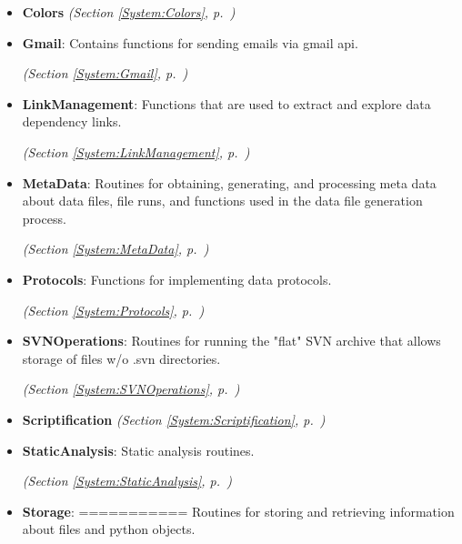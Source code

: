 \begin{itemize}
\setlength{\parskip}{0ex}
\item \textbf{Colors}
  \textit{(Section \ref{System:Colors}, p.~\pageref{System:Colors})}

\item \textbf{Gmail}: Contains functions for sending emails via gmail api.



  \textit{(Section \ref{System:Gmail}, p.~\pageref{System:Gmail})}

\item \textbf{LinkManagement}: 
Functions that are used to extract and explore data dependency links.



  \textit{(Section \ref{System:LinkManagement}, p.~\pageref{System:LinkManagement})}

\item \textbf{MetaData}: 
Routines for obtaining, generating, and processing meta data about data files, 
file runs, and functions used in the data file generation process. 


  \textit{(Section \ref{System:MetaData}, p.~\pageref{System:MetaData})}

\item \textbf{Protocols}: Functions for implementing data protocols.



  \textit{(Section \ref{System:Protocols}, p.~\pageref{System:Protocols})}

\item \textbf{SVNOperations}: Routines for running the "flat" SVN archive that allows storage of files 
w/o .svn directories.



  \textit{(Section \ref{System:SVNOperations}, p.~\pageref{System:SVNOperations})}

\item \textbf{Scriptification}
  \textit{(Section \ref{System:Scriptification}, p.~\pageref{System:Scriptification})}

\item \textbf{StaticAnalysis}: Static analysis routines.



  \textit{(Section \ref{System:StaticAnalysis}, p.~\pageref{System:StaticAnalysis})}

\item \textbf{Storage}: 
===========
Routines for storing and retrieving information about files and python objects. 



\end{itemize}
